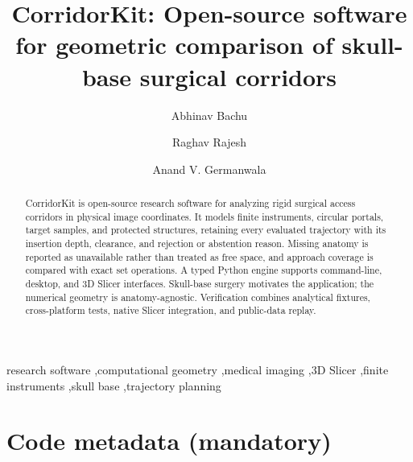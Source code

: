 \documentclass[preprint,12pt]{elsarticle}
\begin{document}
\begin{frontmatter}

\title{CorridorKit: Open-source software for geometric comparison of skull-base surgical corridors}

\author[luc]{Abhinav Bachu}
\author[luc]{Raghav Rajesh}
\author[luc]{Anand V. Germanwala}

\begin{abstract}
CorridorKit is open-source research software for analyzing rigid surgical access corridors in physical image coordinates. It models finite instruments, circular portals, target samples, and protected structures, retaining every evaluated trajectory with its insertion depth, clearance, and rejection or abstention reason. Missing anatomy is reported as unavailable rather than treated as free space, and approach coverage is compared with exact set operations. A typed Python engine supports command-line, desktop, and 3D Slicer interfaces. Skull-base surgery motivates the application; the numerical geometry is anatomy-agnostic. Verification combines analytical fixtures, cross-platform tests, native Slicer integration, and public-data replay.
\end{abstract}

\begin{keyword}
research software \sep computational geometry \sep medical imaging \sep 3D Slicer \sep finite instruments \sep skull base \sep trajectory planning
\end{keyword}

\end{frontmatter}

\clearpage
\section*{Code metadata (mandatory)}
\end{document}
